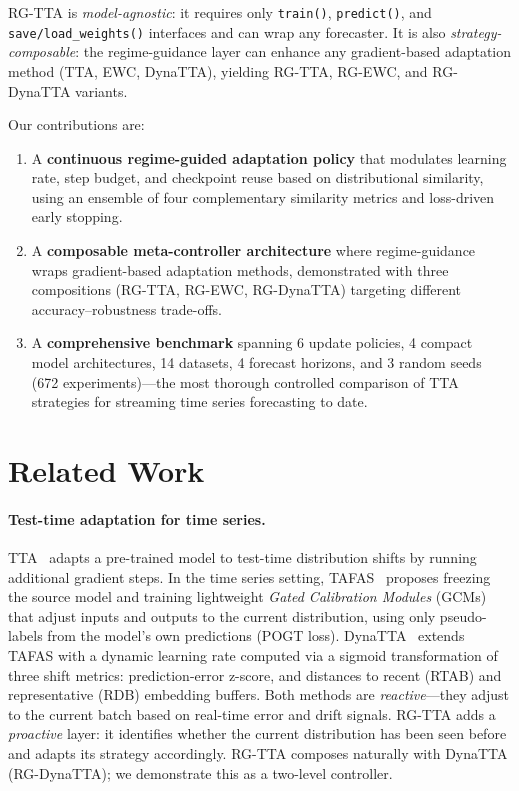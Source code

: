 \documentclass[11pt,a4paper]{article}
\begin{document}
RG-TTA is \emph{model-agnostic}: it requires only \texttt{train()}, \texttt{predict()}, and \texttt{save/load\_weights()} interfaces and can wrap any forecaster. It is also \emph{strategy-composable}: the regime-guidance layer can enhance any gradient-based adaptation method (TTA, EWC, DynaTTA), yielding RG-TTA, RG-EWC, and RG-DynaTTA variants.

Our contributions are:
\begin{enumerate}[nosep]
  \item A \textbf{continuous regime-guided adaptation policy} that modulates learning rate, step budget, and checkpoint reuse based on distributional similarity, using an ensemble of four complementary similarity metrics and loss-driven early stopping.
  \item A \textbf{composable meta-controller architecture} where regime-guidance wraps gradient-based adaptation methods, demonstrated with three compositions (RG-TTA, RG-EWC, RG-DynaTTA) targeting different accuracy--robustness trade-offs.
  \item A \textbf{comprehensive benchmark} spanning 6 update policies, 4 compact model architectures, 14 datasets, 4 forecast horizons, and 3 random seeds (672 experiments)---the most thorough controlled comparison of TTA strategies for streaming time series forecasting to date.
\end{enumerate}


\section{Related Work}
\label{sec:related}

\paragraph{Test-time adaptation for time series.}
TTA~\citep{liang2024tta} adapts a pre-trained model to test-time distribution shifts by running additional gradient steps. In the time series setting, TAFAS~\citep{kim2025tafas} proposes freezing the source model and training lightweight \emph{Gated Calibration Modules} (GCMs) that adjust inputs and outputs to the current distribution, using only pseudo-labels from the model's own predictions (POGT loss). DynaTTA~\citep{grover2025dynatta} extends TAFAS with a dynamic learning rate computed via a sigmoid transformation of three shift metrics: prediction-error z-score, and distances to recent (RTAB) and representative (RDB) embedding buffers. Both methods are \emph{reactive}---they adjust to the current batch based on real-time error and drift signals. RG-TTA adds a \emph{proactive} layer: it identifies whether the current distribution has been seen before and adapts its strategy accordingly. RG-TTA composes naturally with DynaTTA (RG-DynaTTA); we demonstrate this as a two-level controller.
\end{document}
